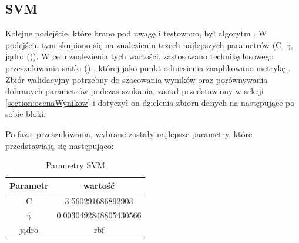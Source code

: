        \subsection{SVM}
        Kolejne podejście, które brano pod uwagę i testowano, był algorytm . W podejściu tym skupiono się na znalezieniu trzech najlepszych parametrów (C, $\gamma$, jądro ()). W celu znalezienia tych wartości, zastosowano technikę losowego przeszukiwania siatki () \cite{SKcv}, której jako punkt odniesienia zaaplikowano metrykę  \cite{SKf1}. Zbiór walidacyjny potrzebny do szacowania wyników oraz porównywania dobranych parametrów podczas szukania, został przedstawiony w sekcji \ref{section:ocenaWynikow} i dotyczył on dzielenia zbioru danych na następujące po sobie bloki.
        
        Po fazie przeszukiwania, wybrane zostały najlepsze parametry, które przedstawiają się następująco:
        \begin{table}[H]
            \centering
             \caption{Parametry SVM}
            \label{tab:my_label}
            \begin{tabular}{| c c |}
            \hline
                 Parametr & wartość \\ \hline \hline
                 C & 3.560291686892903 \\ \hline
                 $\gamma$ & 0.0030492848805430566 \\ \hline
                 jądro & rbf \\ \hline
            \end{tabular}
        \end{table}
